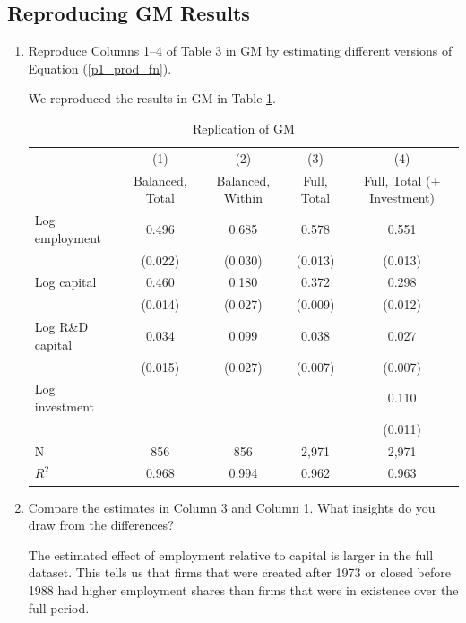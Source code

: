 \documentclass{article}
\begin{document}
\subsection{Reproducing GM Results}
\begin{enumerate}

\item Reproduce Columns 1–4 of Table 3 in GM by estimating diﬀerent versions of
Equation (\ref{p1_prod_fn}).

\begin{answer}

We reproduced the results in GM in Table \ref{tab:gm_rep}.

\begin{table}[H]
\centering
\caption{Replication of GM}
\label{tab:gm_rep}
\begin{tabular}{lcccc}
\toprule
& (1) & (2) & (3) & (4) \\ 
 & Balanced, Total & Balanced, Within & Full, Total & Full, Total (+ Investment) \\
\midrule
Log employment & 0.496 & 0.685 & 0.578 & 0.551 \\
 & (0.022) & (0.030) & (0.013) & (0.013) \\
Log capital & 0.460 & 0.180 & 0.372 & 0.298 \\
 & (0.014) & (0.027) & (0.009) & (0.012) \\
Log R\&D capital & 0.034 & 0.099 & 0.038 & 0.027 \\
 & (0.015) & (0.027) & (0.007) & (0.007) \\
Log investment &  &  &  & 0.110 \\
 &  &  &  & (0.011) \\
 \midrule 
N & 856 & 856 & 2,971 & 2,971 \\
$R^2$ & 0.968 & 0.994 & 0.962 & 0.963 \\
\bottomrule
\end{tabular}
\end{table}

\end{answer}


\item Compare the estimates in Column 3 and Column 1. What insights do you
draw from the differences?

\begin{answer}
The estimated effect of employment relative to capital is larger in the full dataset. This tells us that firms that were created after 1973 or closed before 1988 had higher employment shares than firms that were in existence over the full period.
\end{answer}



\end{enumerate}
\end{document}
